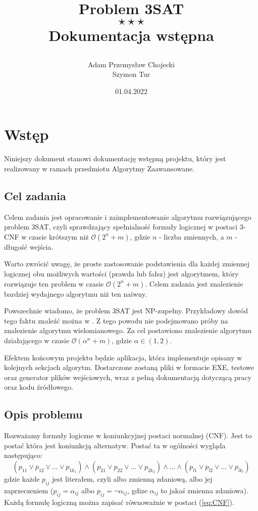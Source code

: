 \documentclass[a4paper,11pt,twoside]{report}
\date{01.04.2022} %
\author{
Adam Przemysław Chojecki \\ Szymon Tur
}
\title{\bf Problem 3SAT \\ $\star\star\star$ \\ Dokumentacja wstępna \par}
\theoremstyle{definition}
\begin{document}
\maketitle

\tableofcontents
\thispagestyle{empty}

\null\thispagestyle{empty}\newpage
{}
\pagestyle{fancy}
\setcounter{page}{3}

\chapter{Wstęp}

Niniejszy dokument stanowi dokumentację wstępną projektu, który jest realizowany w ramach przedmiotu Algorytmy Zaawansowane.

\section{Cel zadania}
Celem zadania jest opracowanie i zaimplementowanie algorytmu rozwiązującego problem 3SAT, czyli sprawdzający spełnialność formuły logicznej w postaci 3-CNF w czasie krótszym niż $\mathcal{O}(2^n + m)$, gdzie $n$ - liczba zmiennych, a $m$ - długość wejścia.

Warto zwrócić uwagę, że proste zastosowanie podstawienia dla każdej zmiennej logicznej obu możliwych wartości (prawda lub fałsz) jest algorytmem, który rozwiązuje ten problem w czasie $\mathcal{O}(2^n + m)$. Celem zadania jest znalezienie bardziej wydajnego algorytmu niż ten naiwny.

Powszechnie wiadomo, że problem 3SAT jest NP-zupełny. Przykładowy dowód tego faktu znaleźć można w \cite{sipser-2009}. Z tego powodu nie podejmowano próby na znalezienie algorytmu wielomianowego. Za cel postawiono znalezienie algorytmu działającego w czasie $\mathcal{O}(\alpha^n + m)$, gdzie $\alpha \in (1,2)$.

Efektem końcowym projektu będzie aplikacja, która implementuje opisany w kolejnych sekcjach algorytm. Dostarczone zostaną pliki w formacie EXE, testowe oraz generator plików wejściowych, wraz z pełną dokumentacją dotyczącą pracy oraz kodu źródłowego.

\section{Opis problemu}\label{sec:opis_problemu}

Rozważamy formuły logiczne w koniunkcyjnej postaci normalnej (CNF). Jest to postać która jest koniunkcją alternatyw. Postać ta w ogólności wygląda następująco:
\begin{equation}
\label{eq:CNF}
(p_{11} \lor p_{12} \lor\dots\lor p_{1k_1})\land (p_{21} \lor p_{22} \lor\dots\lor p_{2k_2})\land\dots\land (p_{l1} \lor p_{l2} \lor\dots\lor p_{lk_l})
\end{equation}
gdzie każde $p_{ij}$ jest literałem, czyli albo zmienną zdaniową, albo jej zaprzeczeniem ($p_{ij} = \alpha_{ij}$ albo $p_{ij} = \lnot\alpha_{ij}$, gdize $\alpha_{ij}$ to jakaś zmienna zdaniowa). Każdą formułę logiczną można zapisać równoważnie w postaci (\ref{eq:CNF}).
\end{document}
